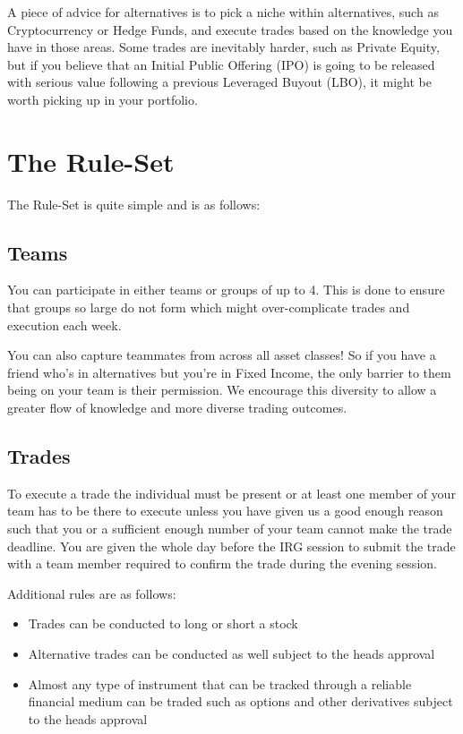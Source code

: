 \documentclass[a4paper]{article}
\begin{document}
{\vspace{10pt}
\noindent A piece of advice for alternatives is to pick a niche within alternatives, such as Cryptocurrency or Hedge Funds, and execute trades based on the knowledge you have in those areas. Some trades are inevitably harder, such as Private Equity, but if you believe that an Initial Public Offering (IPO) is going to be released with serious value following a previous Leveraged Buyout (LBO), it might be worth picking up in your portfolio.

\newpage
\section{The Rule-Set}
The Rule-Set is quite simple and is as follows:

\subsection{Teams}
You can participate in either teams or groups of up to 4. This is done to ensure that groups so large do not form which might over-complicate trades and execution each week.

\vspace{10pt}
\noindent	You can also capture teammates from across all asset classes! So if you have a friend who's in alternatives but you're in Fixed Income, the only barrier to them being on your team is their permission. We encourage this diversity to allow a greater flow of knowledge and more diverse trading outcomes.

\subsection{Trades}
To execute a trade the individual must be present or at least one member of your team has to be there to execute unless you have given us a good enough reason such that you or a sufficient enough number of your team cannot make the trade deadline. You are given the whole day before the IRG session to submit the trade with a team member required to confirm the trade during the evening session.

\vspace{10pt}
\noindent Additional rules are as follows:
\begin{itemize}
	\item Trades can be conducted to long or short a stock
	\item Alternative trades can be conducted as well subject to the heads approval
	\item Almost any type of instrument that can be tracked through a reliable financial medium can be traded such as options and other derivatives subject to the heads approval
\end{itemize}

}
\end{document}
